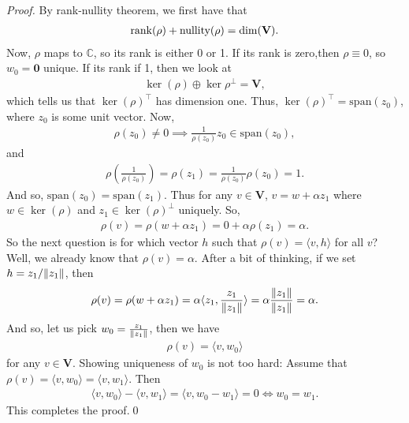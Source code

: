 \documentclass{article}
\theoremstyle{definition}
\newcommand{\C}{\mathbb{C}}
\newcommand{\V}{\mathbf{V}}
\newcommand{\xpan}{\text{span}}
\newcommand{\la}{\langle}
\newcommand{\ra}{\rangle}
\newcommand{\lp}{\left(}
\newcommand{\rp}{\right)}
\begin{document}
\begin{proof}
	By rank-nullity theorem, we first have that
	\begin{align*}
	\rank(\rho) + \text{nullity}(\rho) = \dim(\V).
	\end{align*}
	Now, $\rho$ maps to $\C$, so its rank is either 0 or 1. If its rank is zero,then $\rho \equiv 0$, so $w_0 = \mathbf{0}$ unique. If its rank if 1, then we look at 
	\begin{align*}
	\ker(\rho) \oplus \ker{\rho}^\perp = \V,
	\end{align*}
	which tells us that $\ker(\rho)^\top$ has dimension one. Thus, $\ker(\rho)^\top = \xpan(z_0)$, where $z_0$ is some unit vector. Now, 
	\begin{align*}
	\rho(z_0) \neq 0 \implies \frac{1}{\rho(z_0)}z_0 \in \xpan(z_0),
	\end{align*}
	and
	\begin{align*}
	\rho\lp \frac{1}{\rho(z_0)} \rp = \rho(z_1) = \frac{1}{\rho(z_0)}\rho(z_0) = 1.
	\end{align*}
	And so, $\xpan(z_0) = \xpan(z_1)$. Thus for any $v\in \V$, $v = w + \alpha z_1$ where $w \in \ker(\rho)$ and $z_1 \in \ker(\rho)^\perp$ uniquely. So, 
	\begin{align*}
	\rho(v) = \rho(w + \alpha z_1) = 0 + \alpha\rho(z_1) = \alpha.
	\end{align*}
	So the next question is for which vector $h$ such that $\rho(v) = \la v,h \ra$ for all $v$? Well, we already know that $\rho(v) = \alpha$. After a bit of thinking, if we set $h = z_1 / \norm{z_1}$, then
	\begin{align*}
	\rho(v) = \rho(w + \alpha z_1) = \alpha \la z_1, \frac{z_1}{\norm{z_1}}  \ra = \alpha \frac{\norm{z_1}}{\norm{z_1}} = \alpha.
	\end{align*}
	And so, let us pick $w_0 = \frac{z_1}{\norm{z_1}}$, then we have
	\begin{align*}
	\rho(v) = \la v,w_0 \ra
	\end{align*}
	for any $v\in \V$. Showing uniqueness of $w_0$ is not too hard: Assume that $\rho(v) = \la v,w_0 \ra = \la v,w_1 \ra$. Then 
	\begin{align*}
	\la v,w_0 \ra - \la v,w_1 \ra = \la v, w_0 - w_1\ra = 0 \iff w_0 = w_1.
	\end{align*} 
	This completes the proof.\qed
\end{proof}
\end{document}
